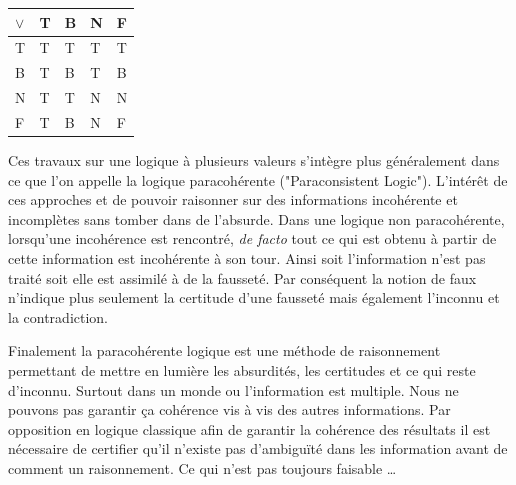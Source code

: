 \begin{refsegment}
\begin{table}[H]
\begin{subtable}{0.35\linewidth}
        \end{subtable}
        \begin{subtable}{0.35\linewidth}
            \centering
            \begin{tabular}{|>{\columncolor{LightCyan}}l|l|l|l|l|}
                \toprule
                \rowcolor{LightCyan}
                $\lor$ & T & B & N & F \\
                \midrule
                T       & T & T & T & T \\ \hline
                B       & T & B & T & B \\ \hline
                N       & T & T & N & N \\ \hline
                F       & T & B & N & F\\
                \bottomrule
            \end{tabular}
        \end{subtable}
    \end{table}

    Ces travaux sur une logique à plusieurs valeurs s'intègre plus généralement dans ce que l'on appelle la logique paracohérente ("Paraconsistent Logic"). L'intérêt de ces approches et de pouvoir raisonner sur des informations incohérente et incomplètes sans tomber dans de l'absurde. Dans une logique non paracohérente, lorsqu'une incohérence est rencontré, \textit{de facto} tout ce qui est obtenu à partir de cette information est incohérente à son tour. Ainsi soit l'information n'est pas traité soit elle est assimilé à de la fausseté. Par conséquent la notion de faux n'indique plus seulement la certitude d'une fausseté mais également l'inconnu et la contradiction.
    
    Finalement la paracohérente logique est une méthode de raisonnement permettant de mettre en lumière les absurdités, les certitudes et ce qui reste d'inconnu. Surtout dans un monde ou l'information est multiple. Nous ne pouvons pas garantir ça cohérence vis à vis des autres informations. Par opposition en logique classique afin de garantir la cohérence des résultats il est nécessaire de certifier qu'il n'existe pas d'ambiguïté dans les information avant de comment un raisonnement. Ce qui n'est pas toujours faisable \ldots
    

\end{refsegment}

